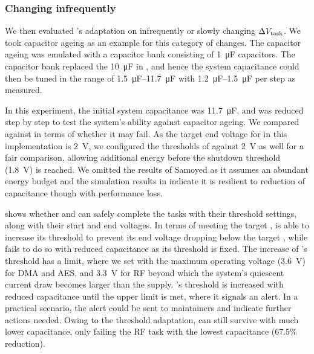 \subsubsection{Changing infrequently}




We then evaluated \nn{}'s adaptation on infrequently or slowly changing $\Delta V_{\text{task}}$.
We took capacitor ageing as an example for this category of changes. 
The capacitor ageing was emulated with a capacitor bank consisting of \SI{1}{\micro\farad} capacitors. 
The capacitor bank replaced the \SI{10}{\micro\farad}  in , and hence the system capacitance could then be tuned in the range of \SIrange{1.5}{11.7}{\micro\farad} with \SIrange{1.2}{1.5}{\micro\farad} per step as measured. 

In this experiment, the initial system capacitance was \SI{11.7}{\micro\farad}, and was reduced step by step to test the system's ability against capacitor ageing. 
We compared \nn{} against \debs{} in terms of whether it may fail. 
As the target end voltage for \nn{} in this implementation is \SI{2}{\volt}, we configured the thresholds of \debs{} against \SI{2}{\volt} as well for a fair comparison, allowing additional energy before the shutdown threshold (\SI{1.8}{\volt}) is reached.
We omitted the results of Samoyed as it assumes an abundant energy budget and the simulation results in  indicate it is resilient to reduction of capacitance though with performance loss. 

 shows whether \nn{} and \debs{} can safely complete the tasks with their threshold settings, along with their start and end voltages.
In terms of meeting the target , \nn{} is able to increase its threshold to prevent its end voltage dropping below the target , while \debs{} fails to do so with reduced capacitance as its threshold is fixed. 
The increase of \nn{}'s threshold has a limit, where we set with the maximum operating voltage (\SI{3.6}{\volt}) for DMA and AES, and \SI{3.3}{\volt} for RF beyond which the system's quiescent current draw becomes larger than the supply.
\nn{}'s threshold is increased with reduced capacitance until the upper limit is met, where it signals an alert.
In a practical scenario, the alert could be sent to maintainers and indicate further actions needed.  
Owing to the threshold adaptation, \nn{} can still survive with much lower capacitance, only failing the RF task with the lowest capacitance (67.5\% reduction). 


